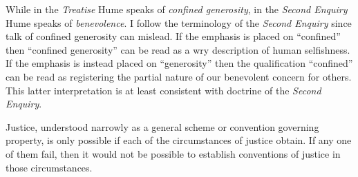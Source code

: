 While in the \emph{Treatise} Hume speaks of \emph{confined generosity}, in the \emph{Second Enquiry} Hume speaks of \emph{benevolence}. I follow the terminology of the \emph{Second Enquiry} since talk of confined generosity can mislead. If the emphasis is placed on ``confined'' then ``confined generosity'' can be read as a wry description of human selfishness. If the emphasis is instead placed on ``generosity'' then the qualification ``confined'' can be read as registering the partial nature of our benevolent concern for others. This latter interpretation is at least consistent with doctrine of the \emph{Second Enquiry}.

Justice, understood narrowly as a general scheme or convention governing property, is only possible if each of the circumstances of justice obtain. If any one of them fail, then it would not be possible to establish conventions of justice in those circumstances.

% 

